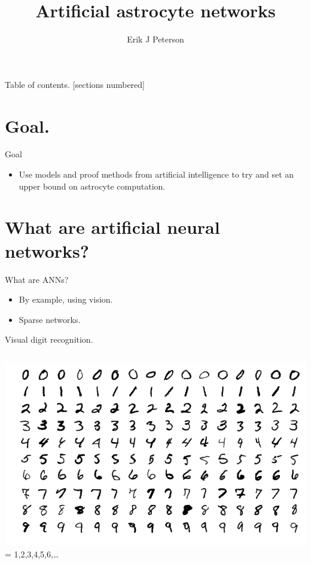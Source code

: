 \documentclass[10pt]{beamer}
\title{Artificial astrocyte networks}
\date{}
\author{Erik J Peterson}
\institute{CoAxLab\\Carnegie Mellon University}
\begin{document}
\maketitle

\begin{frame}{Table of contents.}
  [sections numbered]
  \tableofcontents%
\end{frame}

\section[]{Goal.}
\begin{frame}[fragile]{Goal}
\begin{itemize}
    \item Use models and proof methods from artificial intelligence to try and set an \alert{upper bound} on astrocyte computation.
\end{itemize}
\end{frame}

\section[ANNs]{What are artificial neural networks?}
\begin{frame}[fragile]{What are ANNs?}
\begin{itemize}
\item By example, using vision.
\item Sparse networks.
\end{itemize}
\end{frame}

\begin{frame}[fragile]{Visual digit recognition.}
\begin{columns}
\centering
\includegraphics[scale=0.25]{images/minst.png}
\centering
 = 1,2,3,4,5,6,\ldots
\end{columns}
\end{frame}
\end{document}
